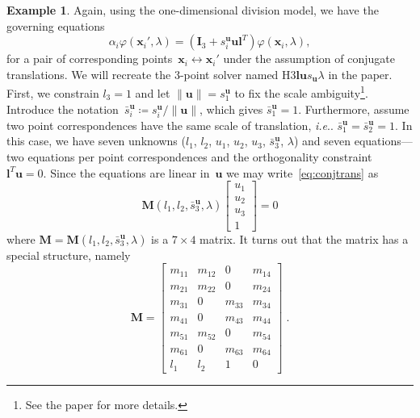 \documentclass[11pt,a4paper]{article}
\makeatletter
\theoremstyle{definition}
\newtheorem{example}{Example}
\renewcommand{\phi}{\varphi}
\newcommand{\T}{T}
\newcommand{\mat}[1]{\bm{#1}}
\newcommand{\norm}[1]{\left\|#1\right\|}
\DeclareRobustCommand\ie{\emph{i.e}\@ifnextchar.{}{.\@}}
\makeatother
\begin{document}
\begin{example}\label{ex:hidden4}
Again, using the one-dimensional division model, we have the
governing equations
\begin{equation}\label{eq:conjtrans}
\alpha_i \phi(\mat{x}_i',\lambda) = \left(\mat{I}_3+s_i^{\mat{u}}\mat{ul}^\T\right)\phi(\mat{x}_i,\lambda),
\end{equation}
for a pair of corresponding points~$\mat{x}_i\leftrightarrow\mat{x}_i'$ under the assumption of
conjugate translations. We will recreate the 3-point solver named H3$\mat{lu}s_{\mat{u}}\lambda$
in the paper. First, we constrain $l_3=1$ and let $\norm{\mat{u}}=s_1^{\mat{u}}$ to fix the scale
ambiguity\footnote{See the paper for more details.}.
Introduce the notation~$\bar{s}_i^{\mat{u}}\coloneqq s_i^{\mat{u}} / \norm{\mat{u}}$, which gives $\bar{s}_1^{\mat{u}}=1$. Furthermore, assume two point correspondences have the same scale of translation,
\ie{} $\bar{s}_1^{\mat{u}} = \bar{s}_2^{\mat{u}} = 1$. In this case, we have seven unknowns ($l_1$,
$l_2$, $u_1$, $u_2$, $u_3$, $\bar{s}_3^{\mat{u}}$, $\lambda$) and seven equations---two equations
per point correspondences and the orthogonality constraint~$\mat{l}^\T\mat{u}= 0$.
Since the equations are linear in~$\mat{u}$ we may write~\eqref{eq:conjtrans} as
\begin{equation}
\mat{M}(l_1,l_2,\bar{s}_3^{\mat{u}},\lambda)\begin{bmatrix} u_1 \\ u_2 \\ u_3 \\1\end{bmatrix} = 0
\end{equation}
where $\mat{M} = \mat{M}(l_1,l_2,\bar{s}_3^{\mat{u}},\lambda)$ is a $7\times 4$ matrix. It turns out that
the matrix has a special structure, namely
\begin{equation}\label{eq:pritts-M}
\mat{M} = \begin{bmatrix}
m_{11} & m_{12} &      0 & m_{14} \\
m_{21} & m_{22} &      0 & m_{24} \\
m_{31} &      0 & m_{33} & m_{34} \\
m_{41} &      0 & m_{43} & m_{44} \\
m_{51} & m_{52} &      0 & m_{54} \\
m_{61} &      0 & m_{63} & m_{64} \\
l_1 & l_2 &   1 & 0
\end{bmatrix}\;.
\end{equation}
\end{example}
\end{document}
